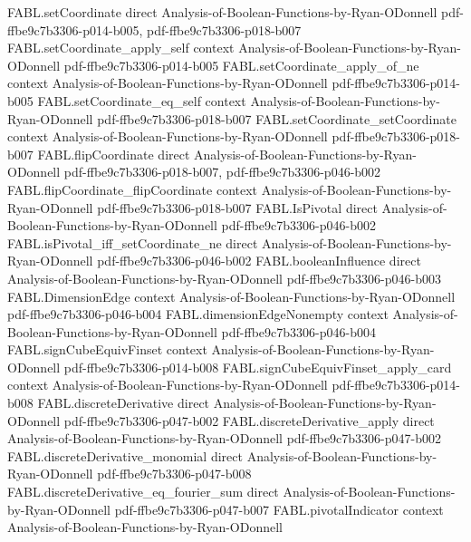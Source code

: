 \begin{theorem}
\proofstep
  {FABL.setCoordinate}
  {direct}
  {Analysis-of-Boolean-Functions-by-Ryan-ODonnell}
  {pdf-ffbe9c7b3306-p014-b005,
    pdf-ffbe9c7b3306-p018-b007}
\proofstep
  {FABL.setCoordinate_apply_self}
  {context}
  {Analysis-of-Boolean-Functions-by-Ryan-ODonnell}
  {pdf-ffbe9c7b3306-p014-b005}
\proofstep
  {FABL.setCoordinate_apply_of_ne}
  {context}
  {Analysis-of-Boolean-Functions-by-Ryan-ODonnell}
  {pdf-ffbe9c7b3306-p014-b005}
\proofstep
  {FABL.setCoordinate_eq_self}
  {context}
  {Analysis-of-Boolean-Functions-by-Ryan-ODonnell}
  {pdf-ffbe9c7b3306-p018-b007}
\proofstep
  {FABL.setCoordinate_setCoordinate}
  {context}
  {Analysis-of-Boolean-Functions-by-Ryan-ODonnell}
  {pdf-ffbe9c7b3306-p018-b007}
\proofstep
  {FABL.flipCoordinate}
  {direct}
  {Analysis-of-Boolean-Functions-by-Ryan-ODonnell}
  {pdf-ffbe9c7b3306-p018-b007,
    pdf-ffbe9c7b3306-p046-b002}
\proofstep
  {FABL.flipCoordinate_flipCoordinate}
  {context}
  {Analysis-of-Boolean-Functions-by-Ryan-ODonnell}
  {pdf-ffbe9c7b3306-p018-b007}
\proofstep
  {FABL.IsPivotal}
  {direct}
  {Analysis-of-Boolean-Functions-by-Ryan-ODonnell}
  {pdf-ffbe9c7b3306-p046-b002}
\proofstep
  {FABL.isPivotal_iff_setCoordinate_ne}
  {direct}
  {Analysis-of-Boolean-Functions-by-Ryan-ODonnell}
  {pdf-ffbe9c7b3306-p046-b002}
\proofstep
  {FABL.booleanInfluence}
  {direct}
  {Analysis-of-Boolean-Functions-by-Ryan-ODonnell}
  {pdf-ffbe9c7b3306-p046-b003}
\proofstep
  {FABL.DimensionEdge}
  {context}
  {Analysis-of-Boolean-Functions-by-Ryan-ODonnell}
  {pdf-ffbe9c7b3306-p046-b004}
\proofstep
  {FABL.dimensionEdgeNonempty}
  {context}
  {Analysis-of-Boolean-Functions-by-Ryan-ODonnell}
  {pdf-ffbe9c7b3306-p046-b004}
\proofstep
  {FABL.signCubeEquivFinset}
  {context}
  {Analysis-of-Boolean-Functions-by-Ryan-ODonnell}
  {pdf-ffbe9c7b3306-p014-b008}
\proofstep
  {FABL.signCubeEquivFinset_apply_card}
  {context}
  {Analysis-of-Boolean-Functions-by-Ryan-ODonnell}
  {pdf-ffbe9c7b3306-p014-b008}
\proofstep
  {FABL.discreteDerivative}
  {direct}
  {Analysis-of-Boolean-Functions-by-Ryan-ODonnell}
  {pdf-ffbe9c7b3306-p047-b002}
\proofstep
  {FABL.discreteDerivative_apply}
  {direct}
  {Analysis-of-Boolean-Functions-by-Ryan-ODonnell}
  {pdf-ffbe9c7b3306-p047-b002}
\proofstep
  {FABL.discreteDerivative_monomial}
  {direct}
  {Analysis-of-Boolean-Functions-by-Ryan-ODonnell}
  {pdf-ffbe9c7b3306-p047-b008}
\proofstep
  {FABL.discreteDerivative_eq_fourier_sum}
  {direct}
  {Analysis-of-Boolean-Functions-by-Ryan-ODonnell}
  {pdf-ffbe9c7b3306-p047-b007}
\proofstep
  {FABL.pivotalIndicator}
  {context}
  {Analysis-of-Boolean-Functions-by-Ryan-ODonnell}

\end{theorem}

